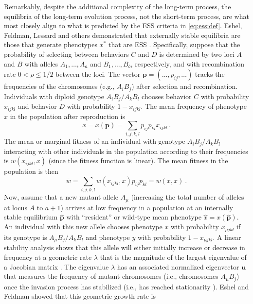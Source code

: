 \documentclass[11pt]{article}
\newcommand{\mean}[1]{\overline{#1}}
\newcommand{\ess}[1]{#1^*}
\newcommand{\fixp}[1]{\hat{#1}}
\renewcommand{\vec}[1]{\symbf{#1}}
\newcommand{\rec}{\rho}
\newcommand{\mut}{\mu}
\newcommand{\eig}{\lambda}
\begin{document}
Remarkably, despite the additional complexity of the long-term process, the equilibria of the long-term evolution process, not the short-term process, are what most closely align to what is predicted by the ESS criteria in \eqref{eq:ess:def}. Eshel, Feldman, Lessard and others demonstrated that externally stable equilibria are those that generate phenotypes $\ess{x}$ that are ESS \cite{Eshel:Feldman:1984,Liberman:1988,Eshel:1996,Hammerstein:Selten:1994,Hammerstein:1996,Weissing:1996,Eshel:Feldman:1998}. Specifically, suppose that the probability of selecting between behaviors $C$ and $D$ is determined by two loci $A$ and $B$ with alleles $A_{1},\ldots,A_{a}$ and $B_{1},\ldots,B_{b}$, respectively, and with recombination rate $0<\rec\le1/2$ between the loci. The vector $\vec{p} = (\ldots,p_{ij},\ldots)$ tracks the frequencies of the chromosomes (e.g., $A_{i} B_{j}$) after selection and recombination. Individuals with diploid genotype $A_{i}B_{j}/A_{k}B_{l}$ chooses behavior $C$ with probability $x_{ijkl}$ and behavior $D$ with probability $1 - x_{ijkl}$. The mean frequency of phenotype $x$ in the population after reproduction is
\begin{equation*}
  x = x(\vec{p}) = \sum_{i,j,k,l} p_{ij} p_{kl} x_{ijkl} \, .
\end{equation*}
The mean or marginal fitness of an individual with genotype $A_{i}B_{j}/A_{k}B_{l}$ interacting with other individuals in the population according to their frequencies is $w(x_{ijkl}, x)$ (since the fitness function is linear). The mean fitness in the population is then
\begin{equation*}
  \mean{w} = \sum_{i,j,k,l} w(x_{ijkl}, x) p_{ij} p_{kl} = w(x, x) \: .
\end{equation*}
Now, assume that a new mutant allele $A_{\mut}$ (increasing the total number of alleles at locus $A$ to $a+1$) arrives at low frequency in a population at an internally stable equilibrium $\fixp{\vec{p}}$ with ``resident'' or wild-type mean phenotype $\fixp{x} = x(\fixp{\vec{p}})$. An individual with this new allele chooses phenotype $x$ with probability $x_{\mut jkl}$ if its genotype is $A_{\mut}B_{j}/A_{k}B_{l}$ and phenotype $y$ with probability $1 - x_{\mut jkl}$. A linear stability analysis shows that this allele will either initially increase or decrease in frequency at a geometric rate $\eig$ that is the magnitude of the largest eigenvalue of a Jacobian matrix \cite{Edelstein-Keshet:2005}. The eigenvalue $\eig$ has an associated normalized eigenvector $\vec{u}$ that measures the frequency of mutant chromosomes (i.e., chromosomes $A_{\mut} B_{j}$) once the invasion process has stabilized (i.e., has reached stationarity \cite{Caswell:2006}). Eshel and Feldman \cite{Eshel:Feldman:1984,Eshel:Feldman:1998} showed that this geometric growth rate is
\end{document}
